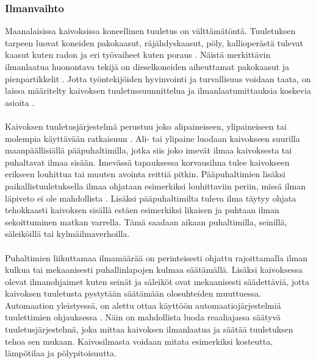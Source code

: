 \documentclass[finnish,12pt,a4paper,pdftex,elec,utf8]{aaltothesis}
\begin{document}

\subsubsection{Ilmanvaihto}
Maanalaisissa kaivoksissa koneellinen tuuletus on välttämätöntä. Tuuletuksen tarpeen luovat koneiden pakokaasut, räjähdyskaasut, pöly, kallioperästä tulevat kaasut kuten radon ja eri työvaiheet kuten poraus \cite[s. 290]{Hakapää}. Näistä merkittävin ilmanlaatua huonontava tekijä on dieselkoneiden aiheuttamat pakokaasut ja pienpartikkelit \cite[s. 290]{Hakapää}. Jotta työntekijöiden hyvinvointi ja turvallisuus voidaan taata, on laissa määritelty kaivoksen tuuletussuunnittelua ja ilmanlaatumittauksia koskevia asioita \cite[s. 285]{Hakapää}.
\\\\
Kaivoksen tuuletusjärjestelmä perustuu joko alipaineiseen, ylipaineiseen tai molempia käyttävään ratkaisuun \cite[s. 290]{Hakapää}. Ali- tai ylipaine luodaan kaivokseen suurilla maanpäällisiällä pääpuhaltimilla, jotka siis joko imevät ilmaa kaivoksesta tai puhaltavat ilmaa sisään. Imevässä tapauksessa korvausilma tulee kaivokseen erikseen louhittua tai muuten avointa reittiä pitkin. Pääpuhaltimien lisäksi paikallistuuletuksella ilmaa ohjataan esimerkiksi louhittaviin periin, missä ilman läpiveto ei ole mahdollista \cite[s. 293]{Hakapää}. Lisäksi pääpuhaltimilta tuleva ilma täytyy ohjata tehokkaasti kaivoksen sisällä estäen esimerkiksi likaisen ja puhtaan ilman sekoittuminen matkan varrella. Tämä saadaan aikaan puhaltimilla, seinillä, säleiköillä tai kylmäilmaverhoilla.
\\\\
Puhaltimien liikuttamaa ilmamäärää on perinteisesti ohjattu rajoittamalla ilman kulkua tai mekaanisesti puhallinlapojen kulmaa säätämällä. Lisäksi kaivoksessa olevat ilmanohjaimet kuten seinät ja säleiköt ovat mekaanisesti säädettäviä, jotta kaivoksen tuuletusta pystytään säätämään olosuhteiden muuttuessa. Automaation yleistyessä, on alettu ottaa käyttöön automaatiojärjestelmiä tuulettimien ohjauksessa \cite[s. 300-301]{Hakapää}. Näin on mahdollista luoda reaaliajassa säätyvä tuuletusjärjestelmä, joka mittaa kaivoksen ilmanlaatua ja säätää tuuletuksen tehoa sen mukaan. Kaivosilmasta voidaan mitata esimerkiksi kosteutta, lämpötilaa ja pölypitoisuutta.
\end{document}
